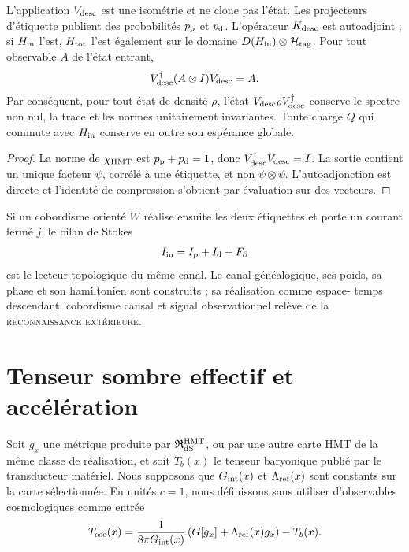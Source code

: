 \begin{theorem}
\label{thm:hmtf2-canal-descendiente}
L'application \(V_{\rm desc}\) est une isométrie et ne clone pas l'état. Les
projecteurs d'étiquette publient des probabilités \(p_{\rm p}\) et
\(p_{\rm d}\). L'opérateur \(K_{\rm desc}\) est autoadjoint ; si
\(H_{\rm in}\) l'est, \(H_{\rm tot}\) l'est également sur le domaine
\(D(H_{\rm in})\otimes\mathcal H_{\rm tag}\). Pour tout observable
\(A\) de l'état entrant,
\[
 V_{\rm desc}^{\dagger}(A\otimes I)V_{\rm desc}=A.
\]
Par conséquent, pour tout état de densité \(\rho\), l'état
\(V_{\rm desc}\rho V_{\rm desc}^{\dagger}\) conserve le spectre non nul,
la trace et les normes unitairement invariantes. Toute charge \(Q\) qui commute avec
\(H_{\rm in}\) conserve en outre son espérance globale.
\end{theorem}

\begin{proof}
La norme de \(\chi_{\rm HMT}\) est
\(p_{\rm p}+p_{\rm d}=1\), donc \(V_{\rm desc}^{\dagger}V_{\rm desc}=I\).
La sortie contient un unique facteur \(\psi\), corrélé à une étiquette,
et non \(\psi\otimes\psi\). L'autoadjonction est directe et l'identité de
compression s'obtient par évaluation sur des vecteurs.
\end{proof}

Si un cobordisme orienté \(W\) réalise ensuite les deux étiquettes et porte
un courant fermé \(j\), le bilan de Stokes
\[
 I_{\rm in}=I_{\rm p}+I_{\rm d}+F_\partial
\]
est le lecteur topologique du même canal. Le canal généalogique, ses poids, sa
phase et son hamiltonien sont construits ; sa réalisation comme espace-
temps descendant, cobordisme causal et signal observationnel relève de la
\textsc{reconnaissance extérieure}.

\section{Tenseur sombre effectif et accélération}
\label{sec:hmtf2-sector-oscuro}

Soit \(g_x\) une métrique produite par
\(\mathfrak R_{\rm dS}^{\rm HMT}\), ou par une autre carte HMT de la même classe
de réalisation, et soit \(T_b(x)\) le tenseur baryonique publié par le
transducteur matériel. Nous supposons que \(G_{\rm int}(x)\) et
\(\Lambda_{\rm ref}(x)\) sont constants sur la carte sélectionnée. En
unités \(c=1\), nous définissons sans utiliser d'observables cosmologiques comme entrée
\[
 T_{\rm osc}(x)
 =\frac1{8\pi G_{\rm int}(x)}
 \left(G[g_x]+\Lambda_{\rm ref}(x)g_x\right)-T_b(x).
\]

